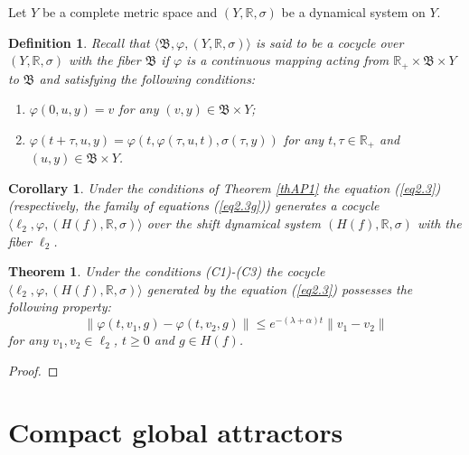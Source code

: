 \documentclass{amsart}%
\newtheorem{theorem}[lemma]{Theorem}
\newtheorem{coro}[lemma]{Corollary}
\newtheorem{definition}[lemma]{Definition}
\begin{document}
Let $Y$ be a complete metric space and $(Y,\mathbb R,\sigma)$ be a
dynamical system on $Y$.

\begin{definition}\label{defC1} Recall \cite[Ch.I]{Che_2015} that
$\langle \mathfrak B,\varphi, (Y,\mathbb R,\sigma)\rangle$ is said
to be a cocycle over $(Y,\mathbb R,\sigma)$ with the fiber
$\mathfrak B$ if $\varphi$ is a continuous mapping acting from
$\mathbb R_{+}\times \mathfrak B\times Y$ to $\mathfrak B$ and
satisfying the following conditions:
\begin{enumerate}
\item $\varphi(0,u,y)=v$ for any $(v,y)\in \mathfrak B\times Y$;
\item
$\varphi(t+\tau,u,y)=\varphi(t,\varphi(\tau,u,t),\sigma(\tau,y))$
for any $t,\tau \in \mathbb R_{+}$ and $(u,y)\in \mathfrak B\times
Y$.
\end{enumerate}
\end{definition}

\begin{coro}\label{corH1}
Under the conditions of Theorem \ref{thAP1} the equation
(\ref{eq2.3}) (respectively, the family of equations
(\ref{eq2.3g})) generates a cocycle $\langle
\ell_{2},\varphi,(H(f),\mathbb R,\sigma)\rangle$ over the shift
dynamical system $(H(f),\mathbb R,\sigma)$ with the fiber
$\ell_{2}$.
\end{coro}

\begin{theorem}\label{thAP2} Under the conditions (C1)-(C3) the
cocycle $\langle \ell_{2},\varphi, (H(f),\mathbb R,\sigma)\rangle$
generated by the equation (\ref{eq2.3}) possesses the following
property:
\begin{equation}\label{eqAP4}
\|\varphi(t,v_1,g)-\varphi(t,v_2,g)\|\le e^{-(\lambda +\alpha)
t}\|v_1-v_2\|
\end{equation}
for any $v_1,v_2\in \ell_{2}$, $t\ge 0$ and $g\in H(f)$.
\end{theorem}
\begin{proof}

\end{proof}

\section{Compact global attractors}
\end{document}
